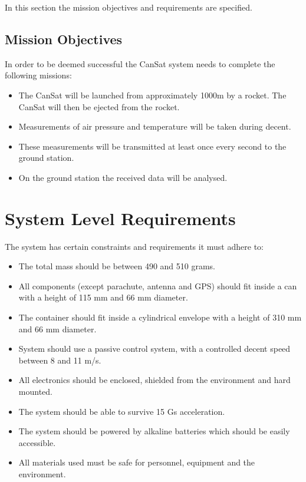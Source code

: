 In this section the mission objectives and requirements are specified.

\subsection{Mission Objectives}
In order to be deemed successful the CanSat system needs to complete the following missions:

\begin{itemize}
    \item The CanSat will be launched from approximately 1000m by a rocket.  The CanSat will then be ejected from the rocket.
    \item Measurements of air pressure and temperature will be taken during decent.
    \item These measurements will be transmitted at least once every second to the ground station.
    \item On the ground station the received data will be analysed.
\end{itemize}

\section{System Level Requirements}
The system has certain constraints and requirements it must adhere to:
\begin{itemize}
    \item The total mass should be between 490 and 510 grams.
    \item All components (except parachute, antenna and GPS) should fit inside a can with a height of 115 mm and 66 mm diameter.
    \item The container should fit inside a cylindrical envelope with a height of 310 mm and 66 mm diameter.
    \item System should use a passive control system, with a controlled decent speed between 8 and 11 m/s.
    \item All electronics should be enclosed, shielded from the environment and hard mounted.
    \item The system should be able to survive 15 Gs acceleration.
    \item The system should be powered by alkaline batteries which should be easily accessible.
    \item All materials used must be safe for personnel, equipment and the environment. 
\end{itemize}

